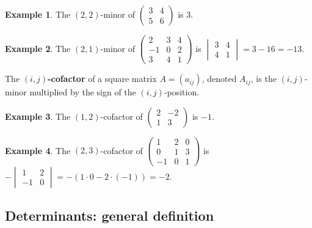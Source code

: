 \documentclass[
  12pt,
  oneside]{book}
\theoremstyle{definition}
\theoremstyle{definition}
\newtheorem{example}{Example}[chapter]
\theoremstyle{definition}
\theoremstyle{definition}
\theoremstyle{remark}
\begin{document}
\begin{example}
\protect\hypertarget{exm:unnamed-chunk-49}{}\label{exm:unnamed-chunk-49}The \((2,2)\)-minor of \(\begin{pmatrix}3&4\\5&6\end{pmatrix}\) is \(3\).
\end{example}

\begin{example}
\protect\hypertarget{exm:unnamed-chunk-50}{}\label{exm:unnamed-chunk-50}The \((2,1)\)-minor of \(\begin{pmatrix}2&3&4\\-1& 0 &2\\3&4&1\end{pmatrix}\) is \(\begin{vmatrix}3&4\\ 4&1\end{vmatrix}=3-16=-13\).
\end{example}

The \textbf{\((i,j)\)-cofactor} of a square matrix \(A=(a_{ij})\), denoted
\(A_{ij}\), is the \((i,j)\)-minor multiplied by the sign of the \((i,j)\)-position.

\begin{example}
\protect\hypertarget{exm:unnamed-chunk-51}{}\label{exm:unnamed-chunk-51}The \((1,2)\)-cofactor of \(\begin{pmatrix}2&-2\\1&3\end{pmatrix}\) is \(-1\).
\end{example}

\begin{example}
\protect\hypertarget{exm:unnamed-chunk-52}{}\label{exm:unnamed-chunk-52}The \((2,3)\)-cofactor of \(\begin{pmatrix}1&2&0\\0&1&3\\-1&0&1\end{pmatrix}\) is \(-\begin{vmatrix}1&2\\-1&0\end{vmatrix}=-(1\cdot0-2\cdot(-1))=-2\).
\end{example}

\hypertarget{determinants-general-definition}{%
\subsection{Determinants: general definition}\label{determinants-general-definition}}
\end{document}
